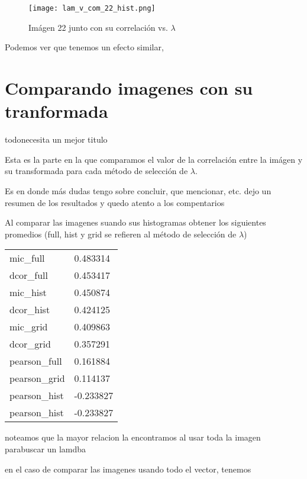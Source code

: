     \begin{figure}[H]
        \centering
        \texttt{[image: lam\_v\_com\_22\_hist.png]}
        \caption{Im\'agen 22 junto con su correlaci\'on vs. $\lambda$}
    \end{figure}

    Podemos ver que tenemos un efecto similar, 



\section{Comparando imagenes con su tranformada}
todo{necesita un mejor titulo}


    Esta es la parte en la que comparamos el valor de la correlaci\'on entre la im\'agen y su transformada para cada m\'etodo de selecci\'on de $\lambda$. 

    Es en donde m\'as dudas tengo sobre concluir, que mencionar, etc. dejo un resumen de los resultados y quedo atento a los compentarios
    
    Al comparar las imagenes suando sus histogramas obtener los siguientes promedios (full, hist y grid se refieren al m\'etodo de selecci\'on de $\lambda$)

    \begin{table}[H]
        \begin{tabular}{ll}
        mic\_full     & 0.483314  \\
        dcor\_full    & 0.453417  \\
        mic\_hist     & 0.450874  \\
        dcor\_hist    & 0.424125  \\
        mic\_grid     & 0.409863  \\
        dcor\_grid    & 0.357291  \\
        pearson\_full & 0.161884  \\
        pearson\_grid & 0.114137  \\
        pearson\_hist & -0.233827 \\
        pearson\_hist & -0.233827
        \end{tabular}
    \end{table}

    noteamos que la mayor relacion la encontramos al usar toda la imagen parabuscar un lamdba

    en el caso de comparar las imagenes usando todo el vector, tenemos

